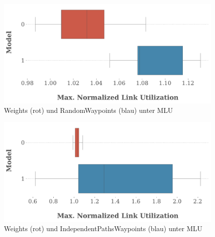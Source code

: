 \documentclass[sigconf,noacm,review]{acmart}
\begin{document}
\begin{figure}
  \centering
  \caption{Weights (rot) und RandomWaypoints (blau) unter MLU}
  \label{fig:weights-vs-random-mlu-plot}
  \includegraphics[width=\linewidth]{assets/weight_random.pdf}
\end{figure}
\begin{figure}
  \centering
  \caption{Weights (rot) und IndependentPathsWaypoints (blau) unter MLU}
  \label{fig:weights-iwp-nanonet}
  \includegraphics[width=\linewidth]{assets/weight_ipw.pdf}
\end{figure}
\end{document}
